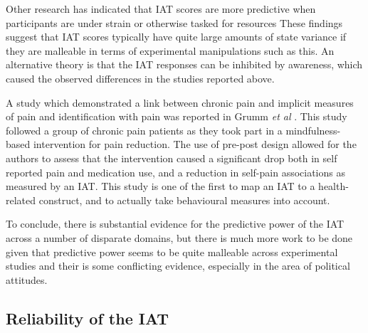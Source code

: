 Other research has indicated that IAT scores are more predictive when participants are under strain or otherwise tasked for resources \cite{Hofmann2008a} These findings suggest that IAT scores typically have quite large amounts of state variance if they are malleable in terms of experimental manipulations such as this. An alternative theory is that the IAT responses can be inhibited by awareness, which caused the observed differences in the studies reported above.  %


A study which demonstrated a link between chronic pain and implicit measures of pain and identification with pain was reported in Grumm \textit{et al} \cite{Grumm2008}. This study followed a group of chronic pain patients as they took part in a mindfulness-based intervention for pain reduction. The use of pre-post design allowed for the authors to assess that the intervention caused a significant drop both in self reported pain and medication use, and a reduction in self-pain associations as measured by an IAT. This study is one of the first to map an IAT to a health-related construct, and to actually take behavioural measures into account. 

To conclude, there is substantial evidence for the predictive power of the IAT across a number of disparate domains, but there is much more work to be done given that predictive power seems to be quite malleable across experimental studies and their is some conflicting evidence, especially in the area of political attitudes. 

\subsection{Reliability of the IAT}
\label{sec:reliability-iat}

